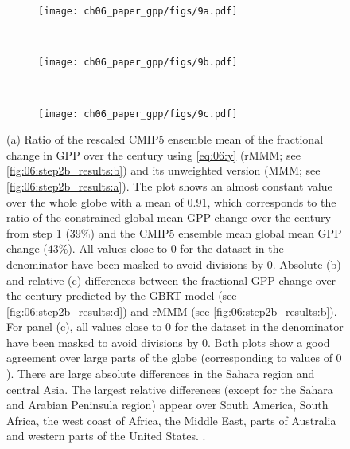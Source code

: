 \begin{figure}[!t]
  \centering
  \begin{subfigure}[b]{\SubfigureWidth{}}
    \texttt{[image: ch06\_paper\_gpp/figs/9a.pdf]}
    \caption{}
    \label{fig:06:step2b_results_biases:a}
  \end{subfigure}
  \\
  \begin{subfigure}[b]{\SubfigureWidth{}}
    \texttt{[image: ch06\_paper\_gpp/figs/9b.pdf]}
    \caption{}
    \label{fig:06:step2b_results_biases:b}
  \end{subfigure}
  ~
  \begin{subfigure}[b]{\SubfigureWidth{}}
    \texttt{[image: ch06\_paper\_gpp/figs/9c.pdf]}
    \caption{}
    \label{fig:06:step2b_results_biases:c}
  \end{subfigure}
  \caption[
    Further illustrations of our \acl{ML} approach to constrain the fractional
    change in \acf{GPP} over the  century with observations in step 2b.
  ]{
    (a) Ratio of the rescaled \acs{CMIP}5 ensemble mean of the fractional
    change in \acf{GPP} over the  century using \cref{eq:06:y}
    (r\acs{MMM}; see \cref{fig:06:step2b_results:b}) and its unweighted version
    (\acs{MMM}; see \cref{fig:06:step2b_results:a}). The plot shows an almost
    constant value over the whole globe with a mean of $0.91$, which
    corresponds to the ratio of the constrained global mean \acs{GPP} change
    over the  century from step 1 ($39 \unit{\%}$) and the \acs{CMIP}5
    ensemble mean global mean GPP change ($43 \unit{\%}$). All values close to
    $0$ for the dataset in the denominator have been masked to avoid divisions
    by $0$. Absolute (b) and relative (c) differences between the fractional
    \acs{GPP} change over the  century predicted by the \acf{GBRT}
    model (see \cref{fig:06:step2b_results:d}) and r\acs{MMM} (see
    \cref{fig:06:step2b_results:b}). For panel (c), all values close to $0$ for
    the dataset in the denominator have been masked to avoid divisions by $0$.
    Both plots show a good agreement over large parts of the globe
    (corresponding to values of $0$). There are large absolute differences in
    the Sahara region and central Asia. The largest relative differences
    (except for the Sahara and Arabian Peninsula region) appear over South
    America, South Africa, the west coast of Africa, the Middle East, parts of
    Australia and western parts of the United States.
    .
  }
  \label{fig:06:step2b_results_biases}
\end{figure}

